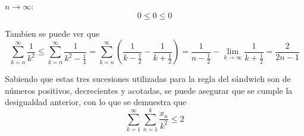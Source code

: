 \documentclass[../../main.tex]{subfiles}
\begin{document}
  $n \to \infty$:
  $$
  0 \leq 0 \leq 0
  $$

  Tambien se puede ver que
  $$
  \sum_{k = n}^\infty \frac{1}{k^2} \leq \sum_{k = n}^\infty \frac{1}{k^2 - \frac{1}{4}} = 
  \sum_{k = n}^\infty \left(\frac{1}{k - \frac{1}{2}} - \frac{1}{k + \frac{1}{2}}\right) =
  \frac{1}{n - \frac{1}{2}} - \lim_{k \to \infty} \frac{1}{k + \frac{1}{2}} = 
  \frac{2}{2n - 1}
  $$

  Sabiendo que estas tres sucesiones utilizadas para la regla del sándwich son de números positivos, decrecientes y acotadas, se puede asegurar que se cumple la desigualdad anterior, con lo que se demuestra que
  $$
  \sum_{k = 1}^\infty \sum_{n = 1}^k \frac{x_n}{k^2} \leq 2
  $$
\end{document}
